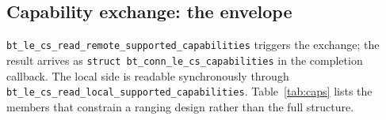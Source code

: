 \documentclass[11pt,a4paper]{article}
\newcommand{\code}[1]{\texttt{\small #1}}
\begin{document}
\subsection{Capability exchange: the envelope}
\label{sec:caps}

\code{bt\_\allowbreak{}le\_\allowbreak{}cs\_\allowbreak{}read\_\allowbreak{}remote\_\allowbreak{}supported\_\allowbreak{}capabilities} triggers the exchange; the result
arrives as \code{struct bt\_\allowbreak{}conn\_\allowbreak{}le\_\allowbreak{}cs\_\allowbreak{}capabilities} in the completion callback. The local
side is readable synchronously through \code{bt\_\allowbreak{}le\_\allowbreak{}cs\_\allowbreak{}read\_\allowbreak{}local\_\allowbreak{}supported\_\allowbreak{}capabilities}.
Table~\ref{tab:caps} lists the members that constrain a ranging design rather than the full
structure.
\end{document}

